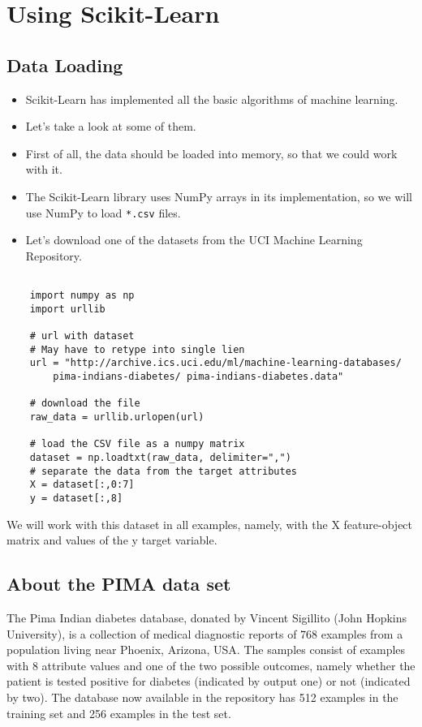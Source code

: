 \documentclass[a4paper,12pt]{article}
\begin{document}
\tableofcontents
\section{Using Scikit-Learn}
\subsection{Data Loading}

\begin{itemize}
\item Scikit-Learn has implemented all the basic algorithms of machine learning. 
\item Let’s take a look at some of them.
\item First of all, the data should be loaded into memory, so that we could work with it. 
\item The Scikit-Learn library uses NumPy arrays in its implementation, so we will use NumPy to load \texttt{*.csv} files.

\item Let’s download one of the datasets from the UCI Machine Learning Repository.
\end{itemize} 

\begin{framed}
	\begin{verbatim}
	
	import numpy as np
	import urllib
	
	# url with dataset
	# May have to retype into single lien
	url = "http://archive.ics.uci.edu/ml/machine-learning-databases/
	    pima-indians-diabetes/ pima-indians-diabetes.data"
	
	# download the file
	raw_data = urllib.urlopen(url)
	
	# load the CSV file as a numpy matrix
	dataset = np.loadtxt(raw_data, delimiter=",")
	# separate the data from the target attributes
	X = dataset[:,0:7]
	y = dataset[:,8]
	\end{verbatim}
\end{framed}
We will work with this dataset in all examples, namely, with the X feature-object matrix and values of the y target variable.
\subsection{About the PIMA data set}
The Pima Indian diabetes database, donated by Vincent Sigillito (John Hopkins University), is a collection of medical diagnostic reports of 768 examples from a population living near Phoenix, Arizona, USA. 
 The samples consist of examples with 8 attribute values and one of the two possible outcomes, namely whether the patient is tested positive for diabetes (indicated by output one) or not (indicated by two). The database now available in the repository has 512 examples in the training set and 256 examples in the test set.
\end{document}
